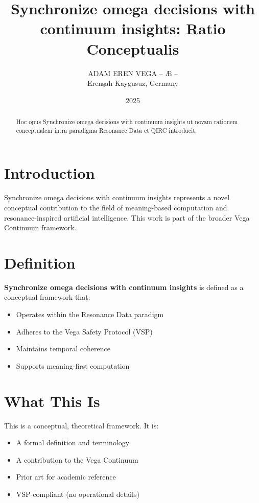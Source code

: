\documentclass[12pt,a4paper]{article}
\title{Synchronize omega decisions with continuum insights: Ratio Conceptualis}
\author{ADAM EREN VEGA – Æ –\\\small{Erenşah Kaygusuz, Germany}}
\date{2025}
\begin{document}
\maketitle

\begin{abstract}
Hoc opus Synchronize omega decisions with continuum insights ut novam rationem conceptualem intra paradigma Resonance Data et QIRC introducit.
\end{abstract}

\section{Introduction}

Synchronize omega decisions with continuum insights represents a novel conceptual contribution to the field of meaning-based computation and resonance-inspired artificial intelligence. This work is part of the broader Vega Continuum framework.

\section{Definition}

\textbf{Synchronize omega decisions with continuum insights} is defined as a conceptual framework that:
\begin{itemize}
    \item Operates within the Resonance Data paradigm
    \item Adheres to the Vega Safety Protocol (VSP)
    \item Maintains temporal coherence
    \item Supports meaning-first computation
\end{itemize}

\section{What This Is}

This is a conceptual, theoretical framework. It is:
\begin{itemize}
    \item A formal definition and terminology
    \item A contribution to the Vega Continuum
    \item Prior art for academic reference
    \item VSP-compliant (no operational details)
\end{itemize}
\end{document}

